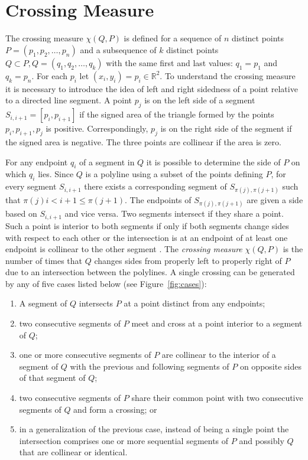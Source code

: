 \documentclass{article}
\begin{document}
\section{Crossing Measure}
\label{sect:measure}

The crossing measure $\chi(Q,P)$ is defined for a sequence of $n$ distinct
points $P=(p_1,p_2,\ldots,p_n)$ and a subsequence of $k$ distinct points $Q
\subset P, Q=(q_1,q_2,\ldots,q_k)$ with the same first and last values:
$q_1= p_1$ and $q_k = p_n$.  For each $p_i$ let $(x_i,y_i)=p_i \in
\mathbb{R}^2$.  To understand the crossing measure it is necessary to
introduce the idea of left and right sidedness of a point relative to a
directed line segment.  A point $p_j$ is on the left side of a segment
$S_{i,i+1}=[p_i,p_{i+1}]$ if the signed area of the triangle formed by the
points $p_i,p_{i+1},p_j$ is positive.  Correspondingly, $p_j$
is on the right side of the segment if the signed area is negative.  The
three points are collinear if the area is zero.

For any endpoint $q_i$ of a segment in $Q$ it is possible to determine the side
of $P$ on which $q_i$ lies. Since $Q$ is a polyline using a
subset of the points defining $P$, for every segment $S_{i,i+1}$ there
exists a corresponding segment of $S_ {\pi(j),\pi(j+1)}$ such that $\pi(j)
i<i+1\leq\pi(j+1)$.  The endpoints of $S_{\pi(j),\pi(j+1)}$ are given a side
based on $S_{i,i+1}$ and vice versa.  Two segments intersect if they share a
point.  Such a point is interior to both segments if only if both segments
change sides with respect to each other or the intersection is at an
endpoint of at least one endpoint is collinear to the other segment \cite[p. 
566]{skiena:2008uq}.  The \emph{crossing measure} $\chi(Q,P)$ is the number
of times that $Q$ changes sides from properly left
to properly right of $P$ due to an intersection between the polylines.  A
single crossing can be generated by any of five cases listed below (see Figure~\ref{fig:cases}):

\begin{enumerate}
  \item{A segment of $Q$ intersects $P$ at a point distinct from any
    endpoints;}
  \item{two consecutive segments of $P$ meet and cross at a point interior
    to a segment of $Q$;}
  \item{one or more consecutive segments of $P$ are collinear to the interior of a segment of $Q$ with the previous and following segments of $P$ on opposite sides of that segment of $Q$;}
\item{two consecutive segments of $P$ share their common point with two consecutive segments of $Q$ and form a crossing; or }
  \item{in a generalization of the previous case, instead of being a
    single point the intersection comprises one or more sequential segments
    of $P$ and possibly $Q$ that are collinear or identical.}
\end{enumerate}
\end{document}
